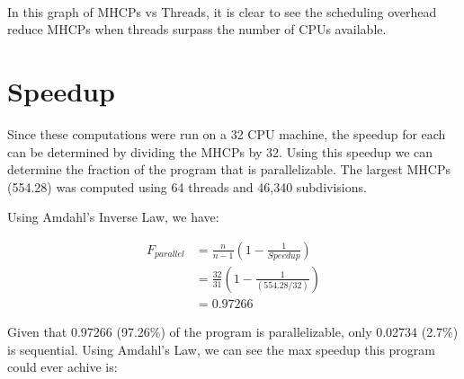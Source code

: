 \documentclass[12pt]{article}
\begin{document}
\\

\noindent In this graph of MHCPs vs Threads, it is clear to see the
scheduling overhead reduce MHCPs when threads surpass the number of CPUs
available.

\section*{Speedup}

Since these computations were run on a 32 CPU machine, the speedup for
each can be determined by dividing the MHCPs by 32. Using this speedup
we can determine the fraction of the program that is parallelizable.
The largest MHCPs (554.28) was computed using 64 threads and 46,340
subdivisions.

Using Amdahl's Inverse Law, we have:

\begin{align*}
    F_{parallel} &= \frac{n}{n-1}\left(1-\frac{1}{Speedup}\right)\\
                 &= \frac{32}{31}\left(1-\frac{1}{(554.28/32)}\right)\\
                 &= 0.97266
\end{align*}

Given that 0.97266 (97.26\%) of the program is parallelizable,
only 0.02734 (2.7\%) is sequential. Using Amdahl's Law, we can see the
max speedup this program could ever achive is:
\end{document}
